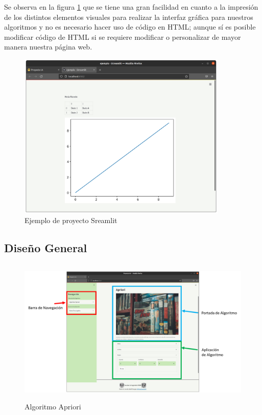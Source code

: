 \documentclass[10pt]{article}
\begin{document}
    Se observa en la figura \ref{fig:ejStreamlit} que se tiene una gran facilidad en cuanto a la impresión de los distintos elementos visuales para realizar la interfaz gráfica para nuestros algoritmos y no es necesario hacer uso de código en HTML; aunque sí es posible modificar código de HTML si se requiere modificar o personalizar de mayor manera nuestra página web.
    
    \begin{figure}[ht!]
    \centering
    \includegraphics[width=10cm]{img/ejStreamlit.png}
    \caption{Ejemplo de proyecto Sreamlit}
    \label{fig:ejStreamlit}
    \end{figure}
    
\newpage
    
\subsection{Diseño General}

    \begin{figure}[ht!]
        \centering
        \includegraphics[height=7cm]{img/Ejemplo.pdf}
        \caption{Algoritmo Apriori}
        \label{fig:Ejemplo}
    \end{figure}
    
\end{document}
